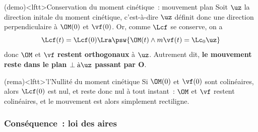 \documentclass[../../main/main.tex]{subfiles}
\begin{document}
\begin{tcb*}(demo)<lftt>{Conservation du moment cinétique~: mouvement
			plan}
	Soit $\uz$ la direction initale du moment cinétique, c'est-à-dire
	\psw{
		\[\Lcf(0) = \OM(0)\wedge m\vf(0) = \Lc_0 \uz\]
	}
	$\uz$ définit donc une direction perpendiculaire à $\OM(0)$ et $\vf(0)$. Or,
	comme $\Lcf$ se conserve, on a
	\[\Lcf(t) = \Lcf(0) \Lra \psw{\OM(t)\wedge m\vf(t) = \Lc_0\uz}\]
	donc $\OM$ et $\vf$ \textbf{restent orthogonaux} à $\uz$. Autrement dit,
	\textbf{le mouvement reste dans le plan $\perp \text{à} \uz$ passant par O}.
	\hqed
\end{tcb*}

\begin{tcb*}(rema)<lftt>'l'{Nullité du moment cinétique}
	Si $\OM(0)$ et $\vf(0)$ sont colinéaires, alors $\Lcf(0)$ est nul, et reste
	donc nul à tout instant~: $\OM$ et $\vf$ restent colinéaires, et le
	mouvement est alors simplement rectiligne.
\end{tcb*}
\vspace{-15pt}

\subsubsection{Conséquence~: loi des aires}

\end{document}
